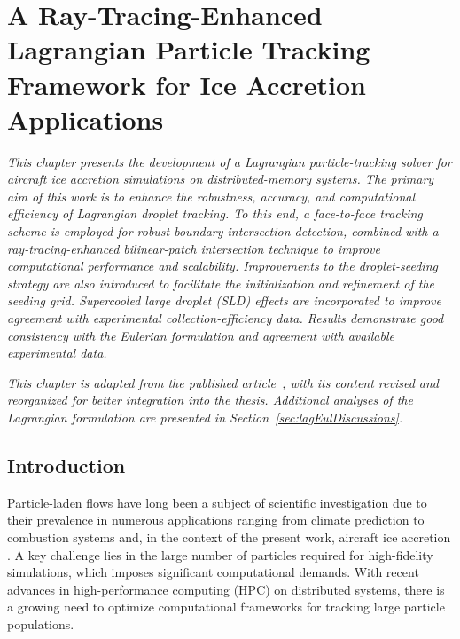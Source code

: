 \chapter{A Ray-Tracing-Enhanced Lagrangian Particle Tracking Framework for Ice Accretion Applications}\label{sec:lagArticle}

\textit
{
This chapter presents the development of a Lagrangian particle-tracking solver for aircraft ice accretion simulations on distributed-memory systems. The primary aim of this work is to enhance the robustness, accuracy, and computational efficiency of Lagrangian droplet tracking. To this end, a face-to-face tracking scheme is employed for robust boundary-intersection detection, combined with a ray-tracing-enhanced bilinear-patch intersection technique to improve computational performance and scalability. Improvements to the droplet-seeding strategy are also introduced to facilitate the initialization and refinement of the seeding grid. Supercooled large droplet (SLD) effects are incorporated to improve agreement with experimental collection-efficiency data. Results demonstrate good consistency with the Eulerian formulation and agreement with available experimental data.
}

\par\vspace{0.5cm}
\noindent\textit{This chapter is adapted from the published article~\cite{ZAYNI2026112019}, with its content revised and reorganized for better integration into the thesis. Additional analyses of the Lagrangian formulation are presented in Section~\ref{sec:lagEulDiscussions}.}

\section{Introduction}
Particle-laden flows have long been a subject of scientific investigation due to their prevalence in numerous applications ranging from climate prediction \cite{climate} to combustion systems \cite{vaango2015cfd} and, in the context of the present work, aircraft ice accretion \cite{rendall2014finite, bellosta2023lagrangian, BALDAN2023105856, sabri2024study}. A key challenge lies in the large number of particles required for high-fidelity simulations, which imposes significant computational demands. With recent advances in high-performance computing (HPC) on distributed systems, there is a growing need to optimize computational frameworks for tracking large particle populations.

